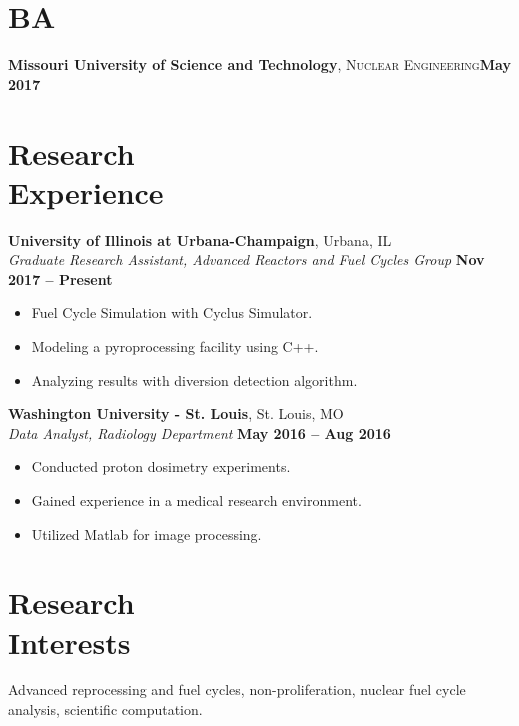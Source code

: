 \documentclass[margin,line]{resume}
\begin{document}
\begin{resume}
    \section{\mysidestyle BA}
    \textbf{Missouri University of Science and Technology}, \textsc{Nuclear Engineering}\hfill\textbf{May 2017}\vspace{-3mm}\\\vspace{-1mm}%
    \section{\mysidestyle Research\\Experience}
    \textbf{University of Illinois at Urbana-Champaign}, Urbana, IL\\
		\textsl{Graduate Research Assistant, Advanced Reactors and Fuel Cycles Group} \hfill \textbf{Nov 2017 -- Present}\\
		\begin{itemize}
			\item Fuel Cycle Simulation with Cyclus Simulator.
			\item Modeling a pyroprocessing facility using C++.
			\item Analyzing results with diversion detection algorithm.
		\end{itemize}

    \textbf{Washington University - St. Louis}, St. Louis, MO\\
		\textsl{Data Analyst, Radiology Department} \hfill \textbf{May 2016 -- Aug 2016}\\
		\begin{itemize}
			\item Conducted proton dosimetry experiments.
			\item Gained experience in a medical research environment.
			\item Utilized Matlab for image processing.
		\end{itemize}
	\section{\mysidestyle Research\\Interests}
	Advanced reprocessing and fuel cycles, non-proliferation, 
		nuclear fuel cycle analysis, scientific computation.%

\end{resume}
\end{document}
